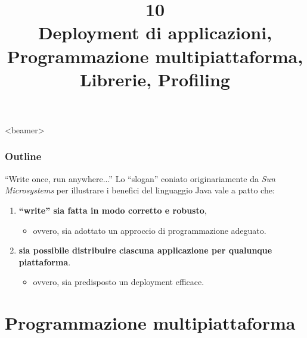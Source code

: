 \documentclass[presentation]{beamer}
\title[L10 -- Deployment, Libraries, Multiplatform]{10\\Deployment di applicazioni, Programmazione multipiattaforma, Librerie, Profiling}
\begin{document}
\frame[label=coverpage]{\titlepage}

\begin{frame}<beamer>
 	\frametitle{Outline}
 	\tableofcontents[]
\end{frame}

\begin{frame}{``Write once, run anywhere...''}
Lo ``slogan'' coniato originariamente da \textit{Sun Microsystems} per illustrare i benefici del linguaggio Java vale a patto che:

\begin{enumerate}\itemsep10pt
\item \textbf{``write'' sia fatta in modo corretto e robusto},
\begin{itemize}
\item ovvero, sia adottato un approccio di programmazione adeguato.
\end{itemize}
\item \textbf{sia possibile distribuire ciascuna applicazione per qualunque piattaforma}.
\begin{itemize}
\item ovvero, sia predisposto un deployment efficace. 
\end{itemize}
\end{enumerate}
\end{frame}

\section{Programmazione multipiattaforma}
\end{document}
